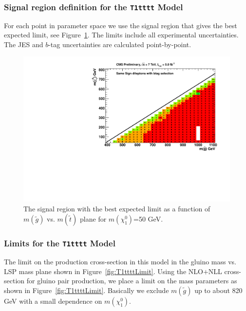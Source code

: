 \subsubsection{Signal region definition for the {\tt T1tttt} Model}
\label{sec:t1ttttdefinition}
For each point in parameter space we use the signal region that gives
the best expected limit, see Figure~\ref{fig:t1tttoptimize}.
The limits include all experimental 
uncertainties.   The JES and $b$-tag uncertainties are calculated point-by-point.


\begin{figure}[htb]
\begin{center}
\includegraphics[width=0.5\linewidth]{figs/T1tttt_BestSignalRegion.pdf}
\caption{The signal region with the best expected limit as a function of 
$m(\widetilde{g})$ vs. $m(\widetilde{t})$ plane for $m(\chi^0_1)$=50 GeV.
\label{fig:t1tttoptimize}}
\end{center}
\end{figure}


\subsubsection{Limits for the {\tt T1tttt} Model}
\label{sec:t1ttttlimits}
The limit on the production cross-section in this model in the 
gluino mass vs. LSP mass plane shown in Figure~\ref{fig:T1ttttLimit}.  
Using the 
NLO$+$NLL cross-section for gluino pair production, we place a limit
on the mass parameters as shown in Figure~\ref{fig:T1ttttLimit}.
Basically we exclude 
$m(\widetilde{g})$ up to about 820 GeV with a small dependence on 
$m(\chi_1^0)$.

